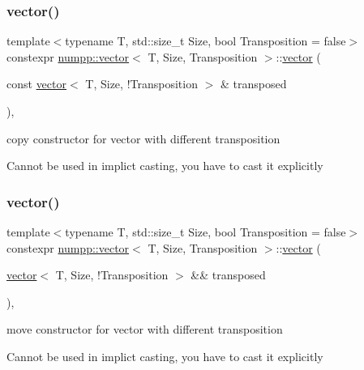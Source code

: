 \subsubsection{\texorpdfstring{vector()}{vector()}\hspace{0.1cm}{\footnotesize\ttfamily [1/2]}}
{\footnotesize\ttfamily template$<$typename T, std\+::size\+\_\+t Size, bool Transposition = false$>$ \\
constexpr \hyperlink{classnumpp_1_1vector}{numpp\+::vector}$<$ T, Size, Transposition $>$\+::\hyperlink{classnumpp_1_1vector}{vector} (\begin{DoxyParamCaption}\item[{const \hyperlink{classnumpp_1_1vector}{vector}$<$ T, Size, !Transposition $>$ \&}]{transposed }\end{DoxyParamCaption})\hspace{0.3cm}{\ttfamily [inline]}, {\ttfamily [explicit]}}



copy constructor for vector with different transposition 

Cannot be used in implict casting, you have to cast it explicitly \mbox{\label{classnumpp_1_1vector_aa1ce55da7e9a2ccf1b1624a9f5347d5e}} 
\subsubsection{\texorpdfstring{vector()}{vector()}\hspace{0.1cm}{\footnotesize\ttfamily [2/2]}}
{\footnotesize\ttfamily template$<$typename T, std\+::size\+\_\+t Size, bool Transposition = false$>$ \\
constexpr \hyperlink{classnumpp_1_1vector}{numpp\+::vector}$<$ T, Size, Transposition $>$\+::\hyperlink{classnumpp_1_1vector}{vector} (\begin{DoxyParamCaption}\item[{\hyperlink{classnumpp_1_1vector}{vector}$<$ T, Size, !Transposition $>$ \&\&}]{transposed }\end{DoxyParamCaption})\hspace{0.3cm}{\ttfamily [inline]}, {\ttfamily [explicit]}}



move constructor for vector with different transposition 

Cannot be used in implict casting, you have to cast it explicitly 

